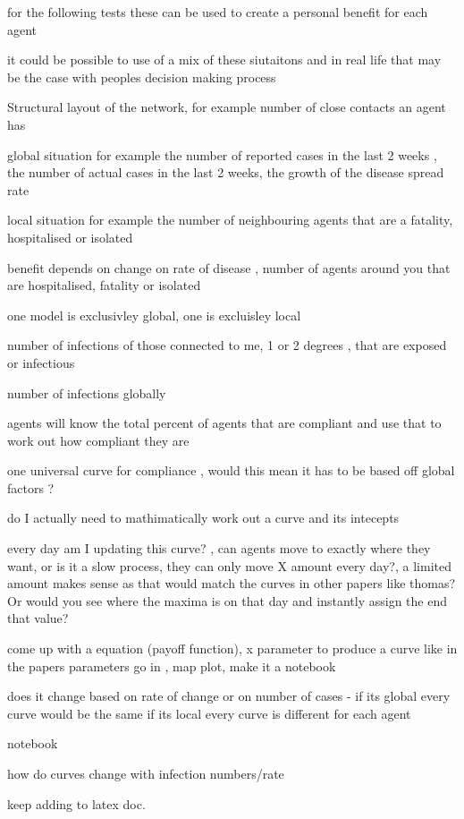 \documentclass{article}
\begin{document}
for the following tests these can be used to create a personal benefit for each agent 

it could be possible to use of a mix of these siutaitons and in real life that may be the case with peoples decision making process


Structural layout of the network, for example number of close contacts an agent has 

global situation for example the number of reported cases in the last 2 weeks , the number of actual cases in the last 2 weeks, the growth of the disease spread rate

local situation for example the number of neighbouring agents that are a fatality, hospitalised or isolated


benefit depends on change on rate of disease , number of agents around you that are hospitalised, fatality or isolated

one model is exclusivley global, one is excluisley local


number of infections of those connected to me, 1 or 2 degrees , that are exposed or infectious

number of infections globally



agents will know the total percent of agents that are compliant and use that to work out how compliant they are

one universal curve for compliance , would this mean it has to be based off global factors ?

do I actually need to mathimatically work out a curve and its intecepts 

every day am I updating this curve? , can agents move to exactly where they want, or is it a slow process, they can only move X amount every day?, a limited amount makes sense as that would match the curves in other papers like thomas?
Or would you see where the maxima is on that day and instantly assign the end that value?

come up with a equation (payoff function), x parameter to produce a curve like in the papers
parameters go in , map plot, make it a notebook

does it change based on rate of change or on number of cases - if its global every curve would be the same
if its local every curve is different for each agent

notebook

how do curves change with infection numbers/rate

keep adding to latex doc.
\end{document}
